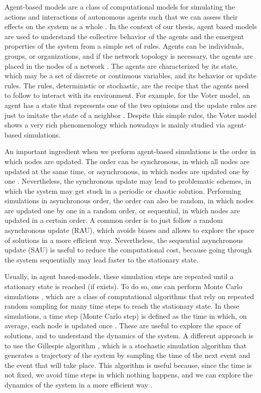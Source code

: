 Agent-based models are a class of computational models for simulating the actions and interactions of autonomous agents such that we can assess their effects on the system as a whole \cite{duffy-1998, bonabeau-2002}. In the context of our thesis, agent based models are used to understand the collective behavior of the agents and the emergent properties of the system from a simple set of rules. Agents can be individuals, groups, or organizations, and if the network topology is necessary, the agents are placed in the nodes of a network \cite{macal-2010, railsback-2011}. The agents are characterized by its state, which may be a set of  discrete or continuous variables, and its behavior or update rules. The rules, deterministic or stochastic, are the recipe that the agents need to follow to interact with its environment. For example, for the Voter model, an agent has a state that represents one of the two opinions and the update rules are just to imitate the state of a neighbor \cite{castellano2009statistical}. Despite this simple rules, the Voter model shows a very rich phenomenology which nowadays is mainly studied via agent-based simulations.

An important ingredient when we perform agent-based simulations is the order in which nodes are updated. The order can be synchronous, in which all nodes are updated at the same time, or asynchronous, in which nodes are updated one by one \cite{macal-2010, railsback-2011}. Nevertheless, the synchronous update may lead to problematic schemes, in which the system may get stuck in a periodic or chaotic solution. Performing simulations in asynchronous order, the order can also be random, in which nodes are updated one by one in a random order, or sequential, in which nodes are updated in a certain order. A common order is to just follow a random asynchronous update (RAU), which avoids biases and allows to explore the space of solutions in a more efficient way. Nevertheless, the sequential asynchronous update (SAU) is useful to reduce the computational cost, because going through the system sequentially may lead faster to the stationary state.

Usually, in agent based-models, these simulation steps are repeated until a stationary state is reached (if exists). To do so, one can perform Monte Carlo simulations \cite{metropolis-1949}, which are a class of computational algorithms that rely on repeated random sampling for many time steps to reach the stationary state. In these simulations, a time step (Monte Carlo step) is defined as the time in which, on average, each node is updated once \cite{newman-1999, landau-2014}. These are useful to explore the space of solutions, and to understand the dynamics of the system. A different approach is to use the Gillespie algorithm \cite{gillespie-1977}, which is a stochastic simulation algorithm that generates a trajectory of the system by sampling the time of the next event and the event that will take place. This algorithm is useful because, since the time is not fixed, we avoid time steps in which nothing happens, and we can explore the dynamics of the system in a more efficient way \cite{gibson-2000}.

